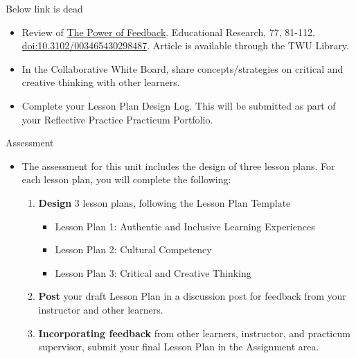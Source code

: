\documentclass[
]{book}
\providecommand{\tightlist}{%
  \setlength{\itemsep}{0pt}\setlength{\parskip}{0pt}}
\begin{document}
\begin{reflect}
{Below link is dead}

\begin{itemize}
\tightlist
\item
  Review of \href{https://eds.b.ebscohost.com/eds/viewarticle/render?data=dGJyMPPp44rp2\%2fdV0\%2bnjisfk5Ie46bRNr6e2TrOk63nn5Kx94um\%2bTq2ntUewprBInqq4S7WwsU6exss\%2b8ujfhvHX4Yzn5eyB4rOrUbessE6vrbJQpOLfhuWz44ak2uBV3\%2bnsPvLX5VW\%2fxKR57LOwTLGosE\%2bzrqR\%2b7ejrefKz5I3q4vJ99uqkf\%2fPb8Yy7yvCN4wAA\&vid=0\&sid=8960916c-989c-44d4-85da-bd021a8a5e8c@pdc-v-sessmgr02}{The Power of Feedback}. Educational Research, 77, 81-112. \url{doi:10.3102/003465430298487}. Article is available through the TWU Library.\\
\item
  In the Collaborative White Board, share concepts/strategies on critical and creative thinking with other learners.\\
\item
  Complete your Lesson Plan Design Log. This will be submitted as part of your Reflective Practice Practicum Portfolio.
\end{itemize}
\end{reflect}

\begin{assessment}
{Assessment}

\begin{itemize}
\tightlist
\item
  The assessment for this unit includes the design of three lesson plans. For each lesson plan, you will complete the following:

  \begin{enumerate}
  \def\labelenumi{\arabic{enumi}.}
  \tightlist
  \item
    \textbf{Design} 3 lesson plans, following the Lesson Plan Template

    \begin{itemize}
    \tightlist
    \item
      Lesson Plan 1: Authentic and Inclusive Learning Experiences\\
    \item
      Lesson Plan 2: Cultural Competency\\
    \item
      Lesson Plan 3: Critical and Creative Thinking\\
    \end{itemize}
  \item
    \textbf{Post} your draft Lesson Plan in a discussion post for feedback from your instructor and other learners.\\
  \item
    \textbf{Incorporating feedback} from other learners, instructor, and practicum supervisor, submit your final Lesson Plan in the Assignment area.
  \end{enumerate}
\end{itemize}
\end{assessment}
\end{document}
